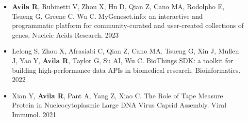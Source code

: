 %
%


\begin{itemize}
    \item \textbf{Avila R}, Rubinetti V, Zhou X, Hu D, Qian Z, Cano MA, Rodolpho E, Tsueng G, Greene C, Wu C. MyGeneset.info: an interactive and programmatic platform for community-curated and user-created collections of genes, Nucleic Acids Research. 2023
    \item Lelong S, Zhou X, Afrasiabi C, Qian Z, Cano MA, Tsueng G, Xin J, Mullen J, Yao Y, \textbf{Avila R}, Taylor G, Su AI, Wu C. BioThings SDK: a toolkit for building high-performance data APIs in biomedical research. Bioinformatics. 2022
    \item Xian Y, \textbf{Avila R}, Pant A, Yang Z, Xiao C. The Role of Tape Measure Protein in Nucleocytoplasmic Large DNA Virus Capsid Assembly. Viral Immunol. 2021

\end{itemize}